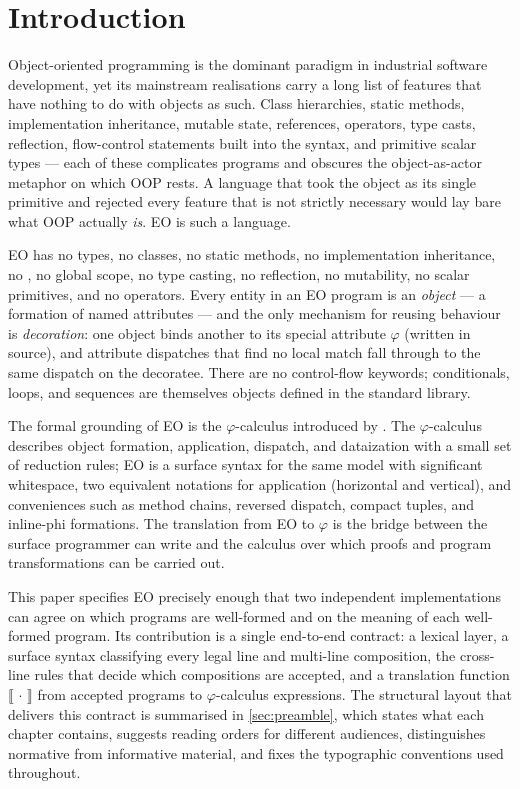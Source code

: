
\section{Introduction}\label{sec:introduction}

Object-oriented programming is the dominant paradigm in industrial software
  development, yet its mainstream realisations carry a long list of features
  that have nothing to do with objects as such.
Class hierarchies, static methods, implementation inheritance, mutable
  state,  references, operators, type casts, reflection,
  flow-control statements built into the syntax, and primitive scalar
  types --- each of these complicates programs and obscures the
  object-as-actor metaphor on which OOP rests.
A language that took the object as its single primitive and rejected
  every feature that is not strictly necessary would lay bare what OOP
  actually \emph{is}.
EO is such a language.

EO has no types, no classes, no static methods, no implementation
  inheritance, no , no global scope, no type casting, no
  reflection, no mutability, no scalar primitives, and no operators.
Every entity in an EO program is an \emph{object} ---
  a formation of named attributes ---
  and the only mechanism for reusing behaviour is \emph{decoration}:
  one object binds another to its special attribute \(\varphi\)
  (written  in source), and attribute dispatches that find no local
  match fall through to the same dispatch on the decoratee.
There are no control-flow keywords;
  conditionals, loops, and sequences are themselves objects defined in
  the standard library.

The formal grounding of EO is the \(\varphi\)-calculus
  introduced by \citet{bugayenko2021eolang}.
The \(\varphi\)-calculus describes object formation, application,
  dispatch, and dataization with a small set of reduction rules;
  EO is a surface syntax for the same model with significant whitespace,
  two equivalent notations for application (horizontal and vertical), and
  conveniences such as method chains, reversed dispatch, compact tuples,
  and inline-phi formations.
The translation from EO to \(\varphi\) is the bridge between the surface
  programmer can write and the calculus over which proofs and program
  transformations can be carried out.

This paper specifies EO precisely enough that two independent
  implementations can agree on which programs are well-formed and on
  the meaning of each well-formed program.
Its contribution is a single end-to-end contract:
  a lexical layer, a surface syntax classifying every legal line and
  multi-line composition, the cross-line rules that decide which
  compositions are accepted, and a translation function
  \(\llbracket\,\cdot\,\rrbracket\) from accepted programs to
  \(\varphi\)-calculus expressions.
The structural layout that delivers this contract is summarised in
  \cref{sec:preamble}, which states what each chapter contains,
  suggests reading orders for different audiences, distinguishes
  normative from informative material, and fixes the typographic
  conventions used throughout.
